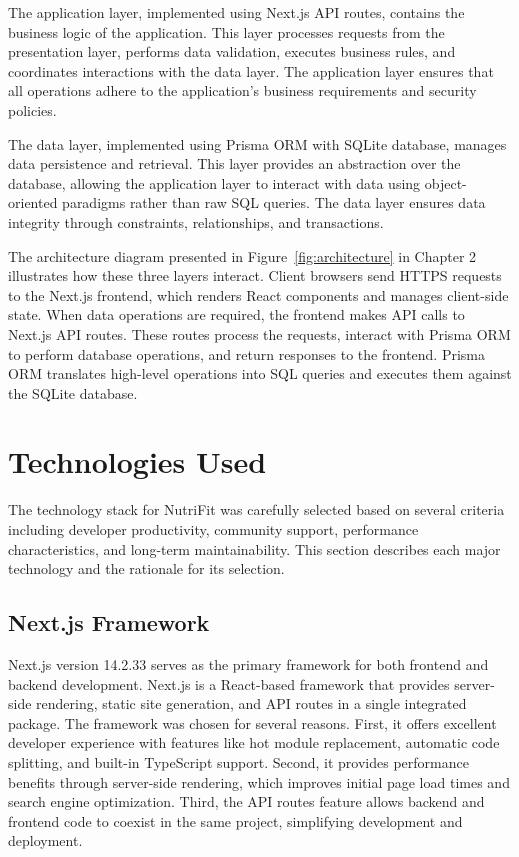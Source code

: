 The application layer, implemented using Next.js API routes, contains the business logic of the application. This layer processes requests from the presentation layer, performs data validation, executes business rules, and coordinates interactions with the data layer. The application layer ensures that all operations adhere to the application's business requirements and security policies.

The data layer, implemented using Prisma ORM with SQLite database, manages data persistence and retrieval. This layer provides an abstraction over the database, allowing the application layer to interact with data using object-oriented paradigms rather than raw SQL queries. The data layer ensures data integrity through constraints, relationships, and transactions.

The architecture diagram presented in Figure~\ref{fig:architecture} in Chapter 2 illustrates how these three layers interact. Client browsers send HTTPS requests to the Next.js frontend, which renders React components and manages client-side state. When data operations are required, the frontend makes API calls to Next.js API routes. These routes process the requests, interact with Prisma ORM to perform database operations, and return responses to the frontend. Prisma ORM translates high-level operations into SQL queries and executes them against the SQLite database.

\section{Technologies Used}

The technology stack for NutriFit was carefully selected based on several criteria including developer productivity, community support, performance characteristics, and long-term maintainability. This section describes each major technology and the rationale for its selection.

\subsection{Next.js Framework}

Next.js version 14.2.33 serves as the primary framework for both frontend and backend development. Next.js is a React-based framework that provides server-side rendering, static site generation, and API routes in a single integrated package. The framework was chosen for several reasons. First, it offers excellent developer experience with features like hot module replacement, automatic code splitting, and built-in TypeScript support. Second, it provides performance benefits through server-side rendering, which improves initial page load times and search engine optimization. Third, the API routes feature allows backend and frontend code to coexist in the same project, simplifying development and deployment.

